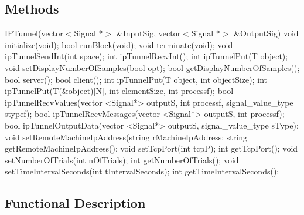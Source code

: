 %

\subsection*{Methods}
%
IPTunnel(vector$<$Signal *$>$ \&InputSig, vector$<$Signal *$>$ \&OutputSig)
\bigbreak
void initialize(void);
\bigbreak
bool runBlock(void);
\bigbreak
void terminate(void);
\bigbreak
void ipTunnelSendInt(int space);
\bigbreak
int ipTunnelRecvInt();
\bigbreak
int ipTunnelPut(T object);
\bigbreak
void setDisplayNumberOfSamples(bool opt);
\bigbreak
bool getDisplayNumberOfSamples();
\bigbreak
bool server();
\bigbreak
bool client();
\bigbreak
int ipTunnelPut(T object, int objectSize);
\bigbreak
int ipTunnelPut(T(\&object)[N], int elementSize, int processf);
\bigbreak
bool ipTunnelRecvValues(vector <Signal*> outputS, int processf, signal\_value\_type stypef);
\bigbreak
bool ipTunnelRecvMessages(vector <Signal*> outputS, int processf);
\bigbreak
bool ipTunnelOutputData(vector <Signal*> outputS, signal\_value\_type sType);
\bigbreak
void setRemoteMachineIpAddress(string rMachineIpAddress;
\bigbreak
string getRemoteMachineIpAddress();
\bigbreak
void setTcpPort(int tcpP);
\bigbreak
int getTcpPort();
\bigbreak
void setNumberOfTrials(int nOfTrials);
\bigbreak
int getNumberOfTrials();
\bigbreak
void setTimeIntervalSeconds(int tIntervalSeconds);
\bigbreak
int getTimeIntervalSeconds();




\subsection*{Functional Description}


